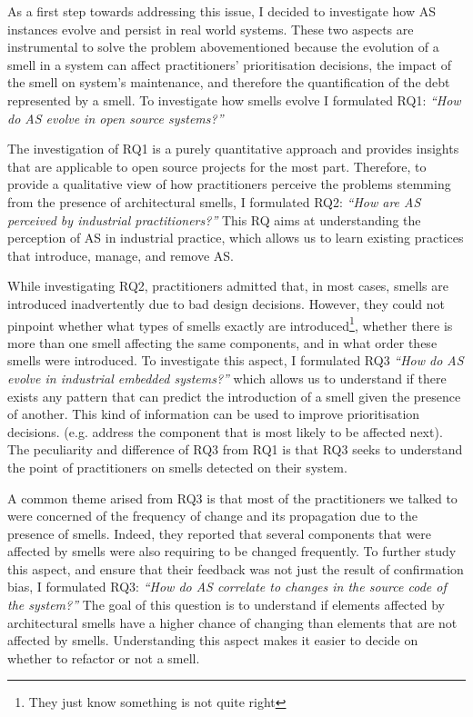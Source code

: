 As a first step towards addressing this issue, I decided to investigate how AS instances evolve and persist in real world systems.
These two aspects are instrumental to solve the problem abovementioned because the evolution of a smell in a system can affect practitioners' prioritisation decisions, the impact of the smell on system's maintenance, and therefore the quantification of the debt represented by a smell.
To investigate how smells evolve I formulated RQ1: \textit{``How do AS evolve in open source systems?''} 

The investigation of RQ1 is a purely quantitative approach and provides insights that are applicable to open source projects for the most part.
Therefore, to provide a qualitative view of how practitioners perceive the problems stemming from the presence of architectural smells, I formulated RQ2: \textit{``How are AS perceived by industrial practitioners?''}
This RQ aims at understanding the perception of AS in industrial practice, which allows us to learn existing practices that introduce, manage, and remove AS.

While investigating RQ2, practitioners admitted that, in most cases, smells are introduced inadvertently due to bad design decisions.
However, they could not pinpoint whether what types of smells exactly are introduced\footnote{They just know something is not quite right}, whether there is more than one smell affecting the same components, and in what order these smells were introduced.
To investigate this aspect, I formulated RQ3 \textit{``How do AS evolve in industrial embedded systems?''}
which allows us to understand if there exists any pattern that can predict the introduction of a smell given the presence of another.
This kind of information can be used to improve prioritisation decisions. (e.g. address the component that is most likely to be affected next).
The peculiarity and difference of RQ3 from RQ1 is that RQ3 seeks to understand the point of practitioners on smells detected on their system.

A common theme arised from RQ3 is that most of the practitioners we talked to were concerned of the frequency of change and its propagation due to the presence of smells. Indeed, they reported that several components that were affected by smells were also requiring to be changed frequently.
To further study this aspect, and ensure that their feedback was not just the result of confirmation bias, I formulated RQ3: \textit{``How do AS correlate to changes in the source code of the system?''}
The goal of this question is to understand if elements affected by architectural smells have a higher chance of changing than elements that are not affected by smells.
Understanding this aspect makes it easier to decide on whether to refactor or not a smell.




